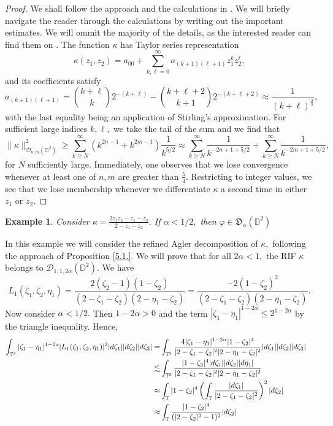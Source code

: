 \documentclass[11pt]{amsart}
\newtheorem{example}[theorem]{Example}
\numberwithin{equation}{section}
\begin{document}
\begin{proof}
We shall follow the approach and the calculations in \cite[Example 12.1]{PLMS}. We will briefly navigate the reader through the calculations by writing out the important estimates. We will ommit the majority of the details, as the interested reader can find them on \cite{PLMS}. The function $\kappa$ has Taylor series representation
$$\kappa(z_1,z_2)=a_{00}+\sum_{k,\ell=0}^{\infty}a_{(k+1)(\ell+1)}z_1^kz_2^{\ell},$$
and its coefficients satisfy $$a_{(k+1)(\ell+1)}=\binom{k+\ell}{k}2^{-(k+\ell)}-\binom{k+\ell+2}{k+1}2^{-(k+\ell+2)}\approx \frac{1}{(k+\ell)^\frac{3}{2}},$$
with the last equality being an application of Stirling's approximation. For sufficient large indices $k,\ell,$ we take the tail of the sum and we find that
$$\|\kappa\|^2_{\mathcal{D}_{n,m}(\mathbb{D}^2)}\ge \sum_{k\ge N}^{\infty}\left(k^{2n-1}+k^{2m-1}\right)\frac{1}{k^{5/2}}\approx\sum^{\infty}_{k\ge N}\frac{1}{k^{-2n+1+5/2}}+\sum_{k\ge N}^{\infty}\frac{1}{k^{-2m+1+5/2}},$$
for $N$ sufficiently large.
Immediately, one observes that we lose convergence whenever at least one of $n,m$ are greater than $\frac{5}{4}.$ Restricting to integer values, we see that we lose membership whenever we differentiate $\kappa$ a second time in either $z_1$ or $z_2.$ 
\end{proof}
\begin{example}
Consider $\kappa=\frac{2z_1z_2-z_1-z_2}{2-z_1-z_2}.$ If $\alpha<1/2,$ then $\varphi\in\mathfrak{D}_{\alpha}(\mathbb{D}^2)$
\end{example}
In this example we will consider the refined Agler decomposition of $\kappa,$ following the approach of Proposition \ref{5.1.}. We will prove that for all $2\alpha<1,$ the RIF $\kappa$ belongs to $\mathcal{D}_{1,1,2\alpha}(\mathbb{D}^2).$  We have
$$L_{1}(\zeta_1,\zeta_2,\eta_1)=\frac{2(\zeta_2-1)(1-\zeta_2)}{(2-\zeta_1-\zeta_2)(2-\eta_1-\zeta_2)}=\frac{-2(1-\zeta_2)^2}{(2-\zeta_1-\zeta_2)(2-\eta_1-\zeta_2)}.$$
Now consider $\alpha<1/2.$ Then $1-2\alpha>0$ and the term $|\zeta_1-\eta_1|^{1-2\alpha}\leq 2^{1-2\alpha}$ by the triangle inequality. Hence,
\begin{align}\int_{\mathbb{T}^3}|\zeta_1-\eta_1|^{1-2a}|L_1(\zeta_1,\zeta_2,\eta_1)|^2|d\zeta_1||d\zeta_2||d\zeta_3|=&\int_{\mathbb{T}^3}\frac{4|\zeta_1-\eta_1|^{1-2\alpha}|1-\zeta_2|^4}{|2-\zeta_1-\zeta_2|^2|2-\eta_1-\zeta_2|^2}|d\zeta_1||d\zeta_2||d\zeta_3|&&\\
\lesssim &\int_{\mathbb{T}^3}\frac{|1-\zeta_2|^4|d\zeta_1||d\zeta_2||d\eta_1|}{|2-\zeta_1-\zeta_2|^2|2-\eta_1-\zeta_2|^2}\notag&&\\ 
\approx&\int_{\mathbb{T}}|1-\zeta_2|^4\left(\int_{\mathbb{T}}\frac{|d\zeta_1|}{|2-\zeta_1-\zeta_2|^2}\right)^2|d\zeta_2|\notag&&\\
\approx&\int_{\mathbb{T}}\frac{|1-\zeta_2|^4}{(|2-\zeta_2|^2-1)^2}|d\zeta_2|\notag
\end{align}
\end{document}
